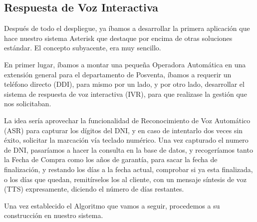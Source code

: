 \subsection{Respuesta de Voz Interactiva}

Después de todo el despliegue, ya íbamos a desarrollar la primera aplicación que hace nuestro sistema Asterisk que destaque por encima de otras soluciones estándar. El concepto subyacente, era muy sencillo.

En primer lugar, íbamos a montar una pequeña Operadora Automática en una extensión general para el departamento de Posventa, íbamos a requerir un teléfono directo (DDI), para mismo por un lado, y por otro lado, desarrollar el sistema de respuesta de voz interactiva (IVR), para que realizase la gestión que nos solicitaban.

La idea sería aprovechar la funcionalidad de Reconocimiento de Voz Automático (ASR) para capturar los dígitos del DNI, y en caso de intentarlo dos veces sin éxito, solicitar la marcación vía teclado numérico. Una vez capturado el numero de DNI, pasaríamos a hacer la consulta en la base de datos, y recogeríamos tanto la Fecha de Compra como los años de garantía, para sacar la fecha de finalización, y restando los días a la fecha actual, comprobar si ya esta finalizada, o los días que quedan, remitírselos los al cliente, con un mensaje síntesis de voz (TTS) expresamente, diciendo el número de días restantes.

Una vez establecido el Algoritmo que vamos a seguir, procedemos a su construcción en nuestro sistema.

